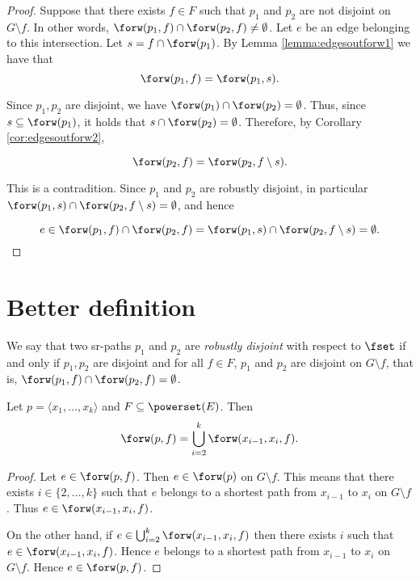 \begin{proof}
Suppose that there exists $f \in F$ such that $p_1$ and $p_2$ are not disjoint on $G \setminus f$.
In other words, $\forw(p_1, f) \cap \forw(p_2, f) \neq \emptyset$. Let $e$ be an edge belonging to
this intersection. Let $s = f \cap \forw(p_1)$. By Lemma \ref{lemma:edgesoutforw1} we have that
$$
\forw(p_1, f) = \forw(p_1, s).
$$

Since $p_1, p_2$ are disjoint, we have $\forw(p_1) \cap \forw(p_2) = \emptyset$. Thus, since $s \subseteq \forw(p_1)$,
it holds that $s \cap \forw(p_2) = \emptyset$. Therefore, by Corollary \ref{cor:edgesoutforw2},

$$
\forw(p_2, f) = \forw(p_2, f \setminus s).
$$

This is a contradition. Since $p_1$ and $p_2$ are robustly disjoint, in particular
$\forw(p_1, s) \cap \forw(p_2, f \setminus s) = \emptyset$, and hence

$$
e \in \forw(p_1, f) \cap \forw(p_2, f) = \forw(p_1, s) \cap \forw(p_2, f \setminus s) = \emptyset.
$$

\end{proof}

\section{Better definition}


We say that two sr-paths $p_1$ and $p_2$ are \emph{robustly disjoint} with respect to $\fset$ if and only if $p_1, p_2$ are disjoint and 
for all $f \in F$, $p_1$ and $p_2$ are disjoint on $G \setminus f$, that is, $\forw(p_1, f) \cap \forw(p_2, f) = \emptyset$. 

\begin{lemma}
Let $p = \langle x_1, \ldots, x_k \rangle$ and $F \subseteq \powerset(E)$. Then
$$
\forw(p, f) = \bigcup_{i = 2}^k \forw(x_{i - 1}, x_i, f).
$$
\end{lemma}

\begin{proof}
Let $e \in \forw(p, f)$. Then $e \in \forw(p)$ on $G \setminus f$. This means that there exists $i \in \{2, \ldots, k\}$ such that
$e$ belongs to a shortest path from $x_{i - 1}$ to $x_i$ on $G \setminus f$. Thus $e \in \forw(x_{i - 1}, x_i, f)$.

On the other hand, if $e \in \bigcup_{i = 2}^k \forw(x_{i - 1}, x_i, f)$ then there exists $i$ such that $e \in \forw(x_{i - 1}, x_i, f)$.
Hence $e$ belongs to a shortest path from $x_{i - 1}$ to $x_i$ on $G \setminus f$. Hence $e \in \forw(p, f)$.
\end{proof}

